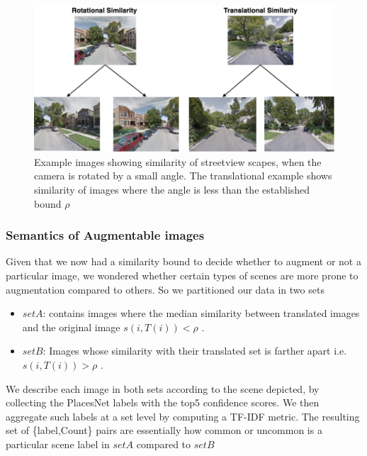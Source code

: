 \begin{figure}[ht]
	\centering
	\includegraphics[width=1.25\columnwidth]{Plot/AugmentationExample.png}
	\caption{Example images showing similarity of streetview scapes, when the camera is rotated by a small angle. The translational example shows similarity of images where the angle is less than the established bound $\rho$}
	\label{fig:augmentationExample}
\end{figure}

\subsubsection{Semantics of Augmentable images}
Given that we now had a similarity bound to decide whether to augment or not a particular image, we wondered whether certain types of scenes are more prone to augmentation compared to others.  So we partitioned our data in two sets
\begin{itemize}
	\item $set A$: contains images where the median similarity  between translated images and the original image ${s(i,T(i))} < \rho$ .
	
	\item $set B$:  Images whose similarity with their translated set is farther apart i.e. ${s(i,T(i))} > \rho$ .
\end{itemize}

We describe each image in both sets according to the scene depicted, by collecting the PlacesNet \cite{zhou2014learning} labels with the top5 confidence scores. We then aggregate such labels at a set level by computing a TF-IDF metric. The resulting set of \{label,Count\} pairs are essentially how common or uncommon is a particular scene label in $setA$ compared to $setB$ 

